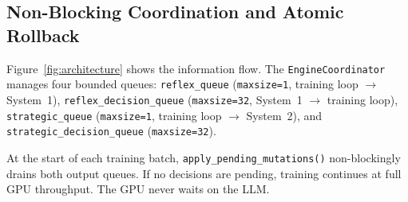 \documentclass[11pt,a4paper]{article}
\begin{document}
\subsection{Non-Blocking Coordination and Atomic Rollback}
\label{sec:agent:coord}

Figure~\ref{fig:architecture} shows the information flow. The \texttt{EngineCoordinator}
manages four bounded queues: \texttt{reflex\_queue} (\texttt{maxsize=1}, training
loop $\to$ System~1), \texttt{reflex\_decision\_queue} (\texttt{maxsize=32}, System~1
$\to$ training loop), \texttt{strategic\_queue} (\texttt{maxsize=1}, training loop
$\to$ System~2), and \texttt{strategic\_decision\_queue} (\texttt{maxsize=32}).

At the start of each training batch, \texttt{apply\_pending\_mutations()} non-blockingly
drains both output queues. If no decisions are pending, training continues at full GPU
throughput. The GPU never waits on the LLM.
\end{document}

